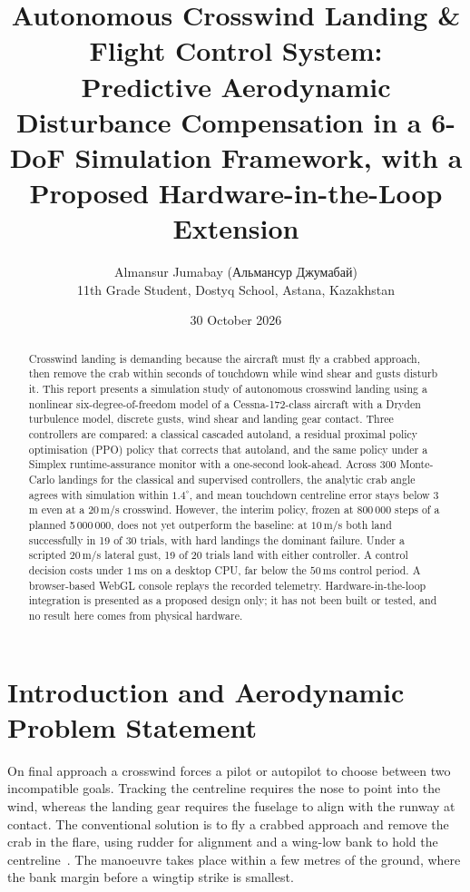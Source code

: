 \documentclass[10pt,a4paper]{article}
\title{\vspace{-1.5em}\textbf{Autonomous Crosswind Landing \& Flight Control System:\\
Predictive Aerodynamic Disturbance Compensation in a 6-DoF Simulation Framework,
with a Proposed Hardware-in-the-Loop Extension}}
\author{Almansur Jumabay ({\fontencoding{T2A}\fontfamily{cmr}\selectfont Альмансур Джумабай})\\
\small 11th Grade Student, Dostyq School, Astana, Kazakhstan}
\date{30 October 2026}
\begin{document}
\maketitle
\thispagestyle{fancy}

\begin{abstract}
\noindent
Crosswind landing is demanding because the aircraft must fly a crabbed approach,
then remove the crab within seconds of touchdown while wind shear and gusts
disturb it. This report presents a simulation study of autonomous crosswind
landing using a nonlinear six-degree-of-freedom model of a Cessna-172-class
aircraft with a Dryden turbulence model, discrete gusts, wind shear and landing
gear contact. Three controllers are compared: a classical cascaded autoland, a
residual proximal policy optimisation (PPO) policy that corrects that autoland,
and the same policy under a Simplex runtime-assurance monitor with a one-second
look-ahead. Across 300 Monte-Carlo landings for the classical and supervised
controllers, the analytic crab angle agrees with simulation within
\(1.4^\circ\), and mean touchdown centreline error stays below \(3\)\,m even at a
\(20\)\,m/s crosswind. However, the interim policy, frozen at 800\,000 steps of a
planned 5\,000\,000, does not yet outperform the baseline: at \(10\)\,m/s both land
successfully in 19 of 30 trials, with hard landings the dominant failure. Under a
scripted \(20\)\,m/s lateral gust, 19 of 20 trials land with either controller.
A control decision costs under \(1\)\,ms on a desktop CPU, far below the \(50\)\,ms
control period. A browser-based WebGL console replays the recorded telemetry.
Hardware-in-the-loop integration is presented as a proposed design only; it has
not been built or tested, and no result here comes from physical hardware.
\end{abstract}

\section{Introduction and Aerodynamic Problem Statement}

On final approach a crosswind forces a pilot or autopilot to choose between two
incompatible goals. Tracking the centreline requires the nose to point into the
wind, whereas the landing gear requires the fuselage to align with the runway at
contact. The conventional solution is to fly a crabbed approach and remove the
crab in the flare, using rudder for alignment and a wing-low bank to hold the
centreline~\cite{stevens2015}. The manoeuvre takes place within a few metres of
the ground, where the bank margin before a wingtip strike is smallest.
\end{document}
